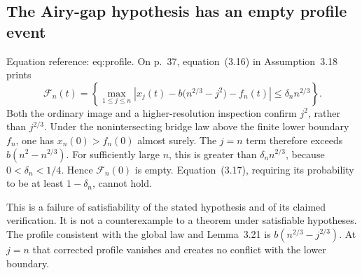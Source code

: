 \documentclass[10pt]{article}
\begin{document}
\subsection*{The Airy-gap hypothesis has an empty profile event}
Equation reference: eq:profile. On p. 37, equation (3.16) in Assumption 3.18 prints \[
 \mathcal F_n(t)=
 \left\{\max_{1\le j\le n}
 \left|x_j(t)-b\bigl(n^{2/3}-j^2\bigr)-f_n(t)\right|
 \le\delta_n n^{2/3}\right\}.\] Both the ordinary image and a higher-resolution inspection confirm \(j^2\), rather than \(j^{2/3}\). Under the nonintersecting bridge law above the finite lower boundary \(f_n\), one has \(x_n(0)>f_n(0)\) almost surely. The \(j=n\) term therefore exceeds \(b(n^2-n^{2/3})\). For sufficiently large \(n\), this is greater than \(\delta_n n^{2/3}\), because \(0<\delta_n<1/4\). Hence \(\mathcal F_n(0)\) is empty. Equation (3.17), requiring its probability to be at least \(1-\delta_n\), cannot hold.\par
This is a failure of satisfiability of the stated hypothesis and of its claimed verification. It is not a counterexample to a theorem under satisfiable hypotheses. The profile consistent with the global law and Lemma 3.21 is \(b(n^{2/3}-j^{2/3})\). At \(j=n\) that corrected profile vanishes and creates no conflict with the lower boundary.\par
\end{document}
